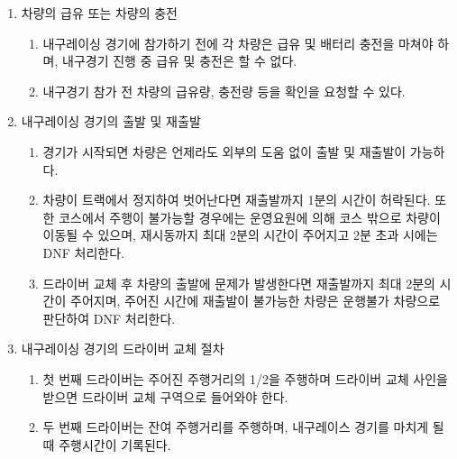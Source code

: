 \documentclass[final,a4paper,10pt]{report}
\begin{document}
{\begin{enumerate}
\begin{enumerate}
    \end{enumerate}
  \item\label{rule:formula-competition.endurance.refuel-or-charge} 차량의 급유 또는 차량의 충전
    \begin{enumerate}
      \item\label{rule:formula-competition.endurance.refuel-or-charge.no-refuel-during-race} 내구레이싱 경기에 참가하기 전에 각 차량은 급유 및 배터리 충전을 마쳐야 하며, 내구경기 진행 중 급유 및 충전은 할 수 없다.
      \item\label{rule:formula-competition.endurance.refuel-or-charge.fuel-charge-amount-check} 내구경기 참가 전 차량의 급유량, 충전량 등을 확인을 요청할 수 있다.
    \end{enumerate}
  \item\label{rule:formula-competition.endurance.start-and-restart} 내구레이싱 경기의 출발 및 재출발
    \begin{enumerate}
      \item\label{rule:formula-competition.endurance.start-and-restart.no-outside-help-anytime} 경기가 시작되면 차량은 언제라도 외부의 도움 없이 출발 및 재출발이 가능하다.
      \item\label{rule:formula-competition.endurance.start-and-restart.stall-restart-time-limit} 차량이 트랙에서 정지하여 벗어난다면 재출발까지 1분의 시간이 허락된다. 또한 코스에서 주행이 불가능할 경우에는 운영요원에 의해 코스 밖으로 차량이 이동될 수 있으며, 재시동까지 최대 2분의 시간이 주어지고 2분 초과 시에는 DNF 처리한다.
      \item\label{rule:formula-competition.endurance.start-and-restart.driver-change-restart-limit} 드라이버 교체 후 차량의 출발에 문제가 발생한다면 재출발까지 최대 2분의 시간이 주어지며, 주어진 시간에 재출발이 불가능한 차량은 운행불가 차량으로 판단하여 DNF 처리한다.
    \end{enumerate}
  \item\label{rule:formula-competition.endurance.driver-change-procedure} 내구레이싱 경기의 드라이버 교체 절차
    \begin{enumerate}
      \item\label{rule:formula-competition.endurance.driver-change-procedure.first-driver-half-distance} 첫 번째 드라이버는 주어진 주행거리의 1/2을 주행하며 드라이버 교체 사인을 받으면 드라이버 교체 구역으로 들어와야 한다.
      \item\label{rule:formula-competition.endurance.driver-change-procedure.second-driver-remaining-distance} 두 번째 드라이버는 잔여 주행거리를 주행하며, 내구레이스 경기를 마치게 될 때 주행시간이 기록된다.

\end{enumerate}
\end{enumerate}}
\end{document}
